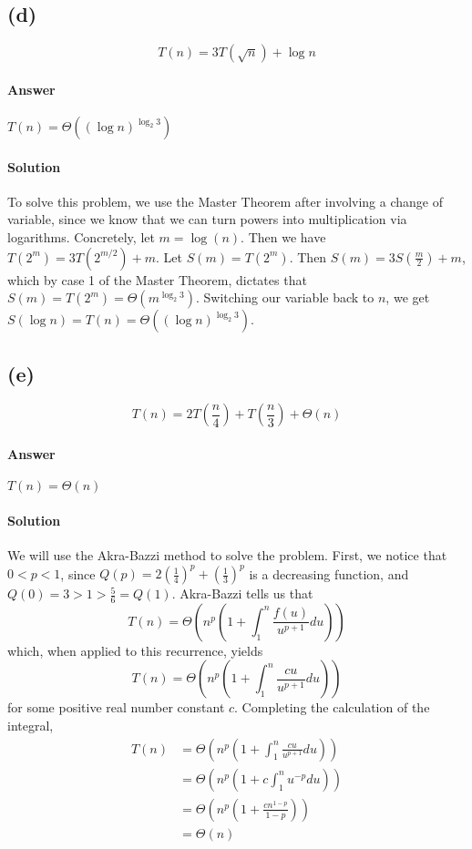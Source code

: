 \documentclass{6046}
\begin{document}
\subsection*{(d)}
$$T(n) = 3T(\sqrt{n}) + \log{n}$$

\paragraph{Answer}
$T(n) = \Theta((\log n)^{\log_2 3})$
\paragraph{Solution}
To solve this problem, we use the Master Theorem after involving a change
of variable, since we know that we can turn powers into multiplication
via logarithms. Concretely, let $m = \log(n)$. Then we
have $T(2^m) = 3T(2^{m/2}) + m$. Let $S(m) = T(2^m)$.
Then $S(m) = 3S(\frac{m}{2}) + m$, which by case 1 of the Master Theorem, 
dictates that $S(m) = T(2^m) = \Theta(m^{\log_2 3})$. Switching our
variable back to $n$, we get $S(\log n) = T(n) = \Theta((\log n)^{\log_2 3})$.

\subsection*{(e)}
$$T(n) = 2T(\frac{n}{4}) + T(\frac{n}{3}) + \Theta(n)$$

\paragraph{Answer}
$T(n) = \Theta(n)$
\paragraph{Solution}
We will use the Akra-Bazzi method to solve the problem. First, we notice that
$0 < p < 1$, since $Q(p) = 2(\frac{1}{4})^p + (\frac{1}{3})^p$ is a decreasing function,
and $Q(0) = 3 > 1 > \frac{5}{6} = Q(1)$. Akra-Bazzi tells us that
$$T(n) = \Theta\left(n^p\left(1 + \int_1^n\frac{f(u)}{u^{p+1}}du\right)\right)$$
which, when applied to this recurrence, yields
$$T(n) = \Theta\left(n^p\left(1 + \int_1^n \frac{cu}{u^{p+1}}du\right)\right)$$
for some positive real number constant $c$.
Completing the calculation of the integral,
\begin{align}
T(n) &= \Theta\left(n^p\left(1 + \int_1^n \frac{cu}{u^{p+1}}du\right)\right)\\
     &= \Theta\left(n^p\left(1 + c \int_1^n u^{-p}du\right)\right)\\
     &= \Theta\left(n^p\left(1 + \frac{cn^{1-p}}{1 - p}\right)\right)\\
     &= \Theta(n)
\end{align}
\end{document}
